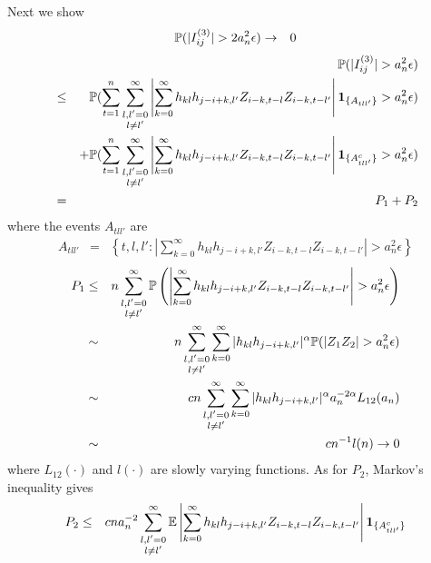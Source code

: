 \documentclass{article}
\begin{document}
Next we show
\begin{eqnarray*}
  \mathbb{P}(|I^{(3)}_{ij}| > 2 a_n^2 \epsilon) &\to& 0
\end{eqnarray*}
\begin{eqnarray*}
  && \mathbb{P}(|I^{(3)}_{ij}| > a_n^2 \epsilon) \\
  &\leq& \mathbb{P}(\sum_{t=1}^n \sum_{\substack{l,l'=0 \\ l \neq l'}}^\infty
  \left|\sum_{k=0}^\infty h_{kl}h_{j-i+k,l'} Z_{i-k,t-l}Z_{i-k,t-l'}\right|
  \mathbf{1}_{\{A_{tll'}\}} > a_n^2 \epsilon ) \\
  && + \mathbb{P}(\sum_{t=1}^n \sum_{\substack{l,l'=0 \\ l \neq l'}}^\infty
  \left|\sum_{k=0}^\infty h_{kl}h_{j-i+k,l'} Z_{i-k,t-l}Z_{i-k,t-l'}\right|
  \mathbf{1}_{\{A^c_{tll'}\}} > a_n^2 \epsilon ) \\
  &=& P_1 + P_2
\end{eqnarray*}
where the events $A_{tll'}$ are
\begin{eqnarray*}
  A_{tll'} &=& \left\{t,l,l': \left|
      \sum_{k=0}^\infty h_{kl}h_{j-i+k,l'} Z_{i-k,t-l}Z_{i-k,t-l'}
    \right| > a_n^2 \epsilon \right\}
\end{eqnarray*}
\begin{eqnarray*}
  P_1 &\leq& n \sum_{\substack{l,l'=0 \\ l \neq l'}}^\infty \mathbb{P}\left(
    \left|\sum_{k=0}^\infty h_{kl}h_{j-i+k,l'} Z_{i-k,t-l}Z_{i-k,t-l'}\right| > a_n^2 \epsilon
  \right) \\
  &\sim& n \sum_{\substack{l,l'=0 \\ l \neq l'}}^\infty \sum_{k=0}^\infty |h_{kl}h_{j-i+k,l'}|^{\alpha} \mathbb{P}(|Z_1 Z_2| > a_n^2 \epsilon)
  \\
  &\sim& c n \sum_{\substack{l,l'=0 \\ l \neq l'}}^\infty
  \sum_{k=0}^\infty |h_{kl}h_{j-i+k,l'}|^{\alpha} a_n^{-2\alpha} L_{12}(a_n)\\  
  &\sim& c n^{-1} l(n)  \to 0
\end{eqnarray*}
where $L_{12}(\cdot)$ and $l(\cdot)$ are slowly varying functions. As
for $P_2$, Markov's inequality gives
\begin{eqnarray*}
  P_2 &\leq& c n a_n^{-2} \sum_{\substack{l,l'=0 \\ l \neq l'}}^\infty
  \mathbb{E}\left|\sum_{k=0}^\infty h_{kl}h_{j-i+k,l'}
    Z_{i-k,t-l}Z_{i-k,t-l'}\right| \mathbf{1}_{\{A^c_{tll'}\}}
\end{eqnarray*}
\end{document}

